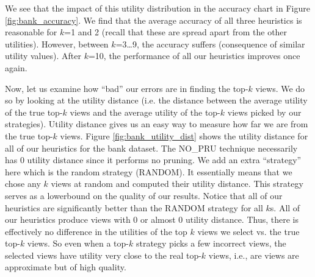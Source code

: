 We see that the impact of this utility distribution in the accuracy chart in
Figure \ref{fig:bank_accuracy}.
We find that the average accuracy of all three heuristics is reasonable for
$k$=1 and 2 (recall that these are spread apart from the other utilities).
However, between $k$=3\ldots9, the accuracy suffers (consequence of similar
utility values).
After $k$=10, the performance of all our heuristics improves once again.

Now, let us examine how ``bad'' our errors are in finding the top-$k$ views.
We do so by looking at the utility distance (i.e. the distance between
the average utility of the true top-$k$ views and the average utility of the
top-$k$ views picked by our strategies).
Utility distance gives us an easy way to measure how far we are from the true
top-$k$ views.
Figure \ref{fig:bank_utility_dist} shows the utility distance for
all of our heuristics for the bank dataset.
The NO\_PRU technique necessarily has 0 utility distance since
it performs no pruning.
We add an extra ``strategy'' here which is the random strategy (RANDOM).
It essentially means that we chose any $k$ views at random and computed their
utility distance.
This strategy serves as a lowerbound on the quality of our results.
Notice that all of our heuristics are significantly better than the RANDOM
strategy for all $k$s.
All of our heuristics produce views with 0 or almost 0 utility distance. 
Thus, there is effectively no difference in the utilities of the top $k$ views
we select vs. the true top-$k$ views.
So even when a top-$k$ strategy picks a few incorrect views, the selected views
have utility very close to the real top-$k$ views, i.e., are views are
approximate but of high quality.

